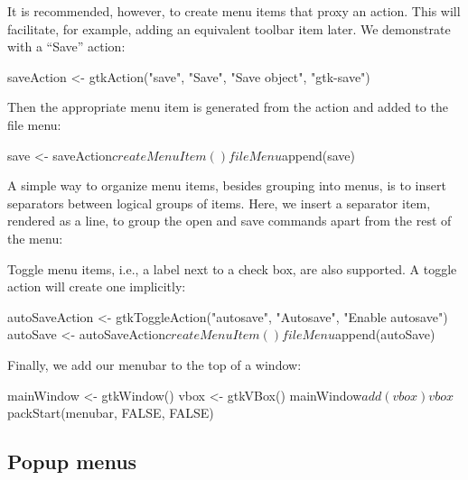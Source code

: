 It is recommended, however, to create menu items that proxy an
action. This will facilitate, for example, adding an equivalent
toolbar item later. We demonstrate with a ``Save'' action:
\begin{Schunk}
\begin{Sinput}
 saveAction <- 
   gtkAction("save", "Save", "Save object", "gtk-save")
\end{Sinput}
\end{Schunk}
%
Then the appropriate menu item is generated from the action and added
to the file menu:
\begin{Schunk}
\begin{Sinput}
 save <- saveAction$createMenuItem()
 fileMenu$append(save)
\end{Sinput}
\end{Schunk}

A simple way to organize menu items, besides grouping into menus, is
to insert separators between logical groups of items. Here, we insert
a separator item, rendered as a line, to group the open and save
commands apart from the rest of the menu:
\begin{Schunk}
\end{Schunk}

Toggle menu items, i.e., a label next to a check box, are also
supported. A toggle action will create one implicitly:
\begin{Schunk}
\begin{Sinput}
 autoSaveAction <- gtkToggleAction("autosave", "Autosave", 
                                   "Enable autosave")
 autoSave <- autoSaveAction$createMenuItem()
 fileMenu$append(autoSave)
\end{Sinput}
\end{Schunk}

Finally, we add our menubar to the top of a window:
\begin{Schunk}
\begin{Sinput}
 mainWindow <- gtkWindow()
 vbox <- gtkVBox()
 mainWindow$add(vbox)
 vbox$packStart(menubar, FALSE, FALSE)
\end{Sinput}
\end{Schunk}

\subsection{Popup menus}

